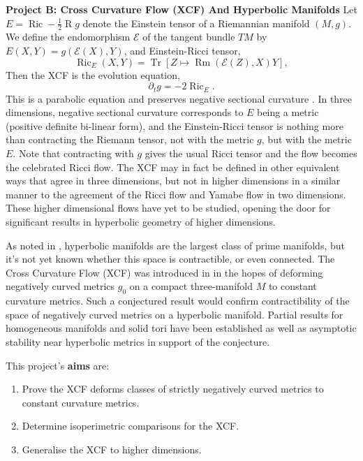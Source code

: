 \documentclass[12pt]{amsart}
\begin{document}
\noindent\textbf{Project B: Cross Curvature Flow (XCF) And Hyperbolic Manifolds}
\label{sec-2-2}
Let $E = \operatorname{Ric} - \tfrac{1}{2} \operatorname{R} g$ denote the Einstein tensor of a Riemannian manifold $(M, g)$. We define the endomorphism $\mathcal{E}$ of the tangent bundle $TM$ by $E(X, Y) = g(\mathcal{E}(X), Y)$, and Einstein-Ricci tensor,
\[
\operatorname{Ric}_E (X, Y) = \operatorname{Tr} \left[Z \mapsto \operatorname{Rm} (\mathcal{E}(Z), X) Y\right],
\]
Then the XCF is the evolution equation,
\[
\partial_t g = -2 \operatorname{Ric}_E.
\]
This is a parabolic equation and preserves negative sectional curvature \cite{MR2055396,MR2207496}. In three dimensions, negative sectional curvature corresponds to $E$ being a metric (positive definite bi-linear form), and the Einstein-Ricci tensor is nothing more than contracting the Riemann tensor, not with the metric $g$, but with the metric $E$. Note that contracting with $g$ gives the usual Ricci tensor and the flow becomes the celebrated Ricci flow. The XCF may in fact be defined in other equivalent ways that agree in three dimensions, but not in higher dimensions in a similar manner to the agreement of the Ricci flow and Yamabe flow in two dimensions. These higher dimensional flows have yet to be studied, opening the door for significant results in hyperbolic geometry of higher dimensions.

As noted in \cite{MR2602839}, hyperbolic manifolds are the largest class of prime manifolds, but it's not yet known whether this space is contractible, or even connected. The Cross Curvature Flow (XCF) was introduced in \cite{MR2055396} in the hopes of deforming negatively curved metrics $g_0$ on a compact three-manifold $M$ to constant curvature metrics. Such a conjectured result would confirm contractibility of the space of negatively curved metrics on a hyperbolic manifold. Partial results for homogeneous manifolds and solid tori have been established \cite{MR2407107,MR2653711,MR2602839} as well as asymptotic stability near hyperbolic metrics \cite{MR2448593} in support of the conjecture.

This project's \textbf{aims} are:
\begin{enumerate}[label=\textbf{(B.\arabic*)}]
\item Prove the XCF deforms classes of strictly negatively curved metrics to constant curvature metrics.
\item Determine isoperimetric comparisons for the XCF.
\item Generalise the XCF to higher dimensions.
\end{enumerate}
\end{document}
